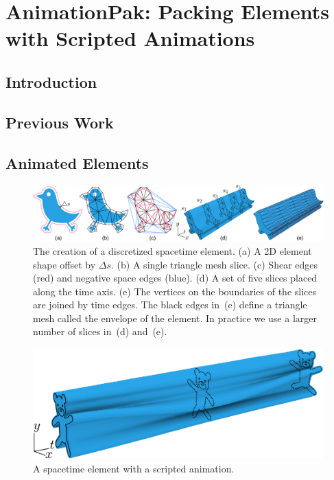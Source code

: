 \chapter{AnimationPak: Packing Elements with Scripted Animations}


\section{Introduction}


\section{Previous Work}


\section{Animated Elements}

\begin{figure}
\centering
\includegraphics[width=1.0\textwidth]{figures/animationpak/discretization.pdf} 
\caption{\label{fig_discretization} 
The creation of a discretized spacetime element.  
(a) A 2D element shape offset by $\Delta s$.
(b) A single triangle mesh slice.
(c) Shear edges (red) and negative space edges (blue).
(d) A set of five slices placed along the time axis.
(e) The vertices on the boundaries of the slices are joined by 
	time edges.  The black edges in~(e) define a triangle mesh
	called the envelope of the element.
	In practice we use a larger number of slices in~(d) and~(e).
}
\end{figure}

\begin{figure}
\centering
\includegraphics[width=1.0\columnwidth]{figures/animationpak/spacetime_element.pdf} 
\caption{\label{fig_spacetime_element} 
A spacetime element with a scripted animation.}
\end{figure}



